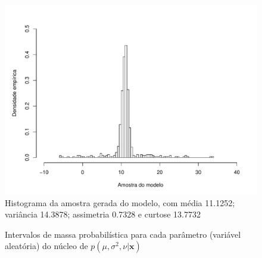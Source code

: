 \documentclass[9pt]{beamer}
\begin{document}
\begin{frame}
\begin{figure}[htb]
\centering
\includegraphics[scale=0.5]{figuras/amostra_n.pdf}
\caption{Histograma da amostra gerada do modelo, com média 11.1252; variância 14.3878; assimetria 0.7328 e curtose 13.7732}
\label{fig:sample_n.pdf}
\end{figure}
\end{frame}
\begin{frame}
\begin{figure}[htb]\footnotesize
\centering
{}%
\caption{Intervalos de massa probabilística para cada parâmetro (variável aleatória) do núcleo de $p(\mu, \sigma^2, \nu | \bm{x})$}%
\end{figure}
\end{frame}
\end{document}
